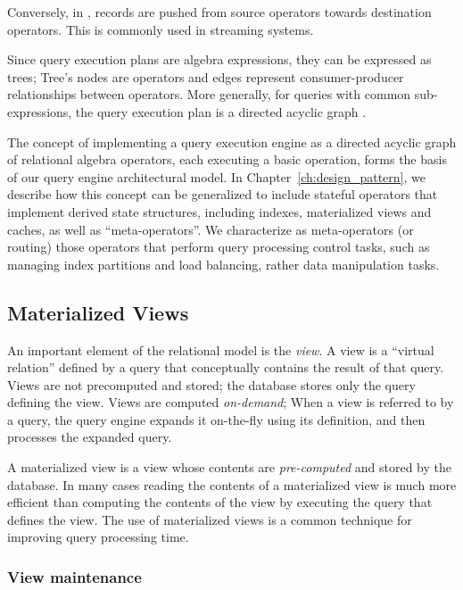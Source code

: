 Conversely, in , records are pushed from source operators towards destination operators.
This is commonly used in streaming systems.

Since query execution plans are algebra expressions, they can be expressed as trees;
Tree's nodes are operators and edges represent consumer-producer relationships between operators.
More generally, for queries with common sub-expressions,
the query execution plan is a directed acyclic graph \cite{graefe:queryevaluation}.


\bigskip
\noindent
The concept of implementing a query execution engine as a directed acyclic graph of relational algebra operators,
each executing a basic operation, forms the basis of our query engine architectural model.
In Chapter~\ref{ch:design_pattern}, we describe how this concept can be generalized to include
stateful operators that implement derived state structures, including indexes, materialized views and caches,
as well as  ``meta-operators''.
We characterize as meta-operators (or routing) those operators that perform query processing control tasks,
such as managing index partitions and load balancing, rather data manipulation tasks.

\subsection{Materialized Views}
\label{sec:materialize_views}
An important element of the relational model is the \textit{view}.
A view is a ``virtual relation'' defined by a query that conceptually contains the result of that query.
Views are not precomputed and stored; the database stores only the query defining the view.
Views are computed \textit{on-demand};
When a view is referred to by a query, the query engine expands it on-the-fly using its definition,
and then processes the expanded query.

A materialized view is a view whose contents are \textit{pre-computed} and stored by the database.
In many cases reading the contents of a materialized view is much more efficient than computing the contents of the view
by executing the query that defines the view.
The use of materialized views is a common technique for improving query processing time.

\subsubsection{View maintenance}

